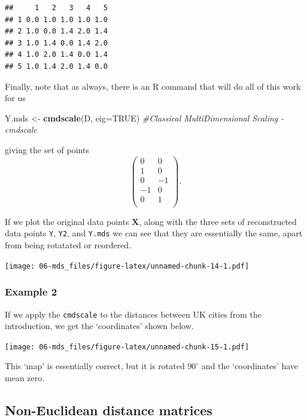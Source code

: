 \documentclass[]{book}
\newenvironment{Shaded}{\begin{snugshade}}{\end{snugshade}}
\newcommand{\CommentTok}[1]{\textcolor[rgb]{0.56,0.35,0.01}{\textit{#1}}}
\newcommand{\DataTypeTok}[1]{\textcolor[rgb]{0.13,0.29,0.53}{#1}}
\newcommand{\KeywordTok}[1]{\textcolor[rgb]{0.13,0.29,0.53}{\textbf{#1}}}
\newcommand{\NormalTok}[1]{#1}
\newcommand{\OtherTok}[1]{\textcolor[rgb]{0.56,0.35,0.01}{#1}}
\newcommand{\StringTok}[1]{\textcolor[rgb]{0.31,0.60,0.02}{#1}}
\theoremstyle{definition}
\theoremstyle{definition}
\theoremstyle{definition}
\theoremstyle{remark}
\begin{document}
\begin{verbatim}
##     1   2   3   4   5
## 1 0.0 1.0 1.0 1.0 1.0
## 2 1.0 0.0 1.4 2.0 1.4
## 3 1.0 1.4 0.0 1.4 2.0
## 4 1.0 2.0 1.4 0.0 1.4
## 5 1.0 1.4 2.0 1.4 0.0
\end{verbatim}

Finally, note that as always, there is an R command that will do all of this work for us

\begin{Shaded}
\begin{Highlighting}[]
\NormalTok{Y.mds <-}\StringTok{ }\KeywordTok{cmdscale}\NormalTok{(D, }\DataTypeTok{eig=}\OtherTok{TRUE}\NormalTok{) }\CommentTok{#Classical MultiDimensional Scaling - cmdscale}
\end{Highlighting}
\end{Shaded}

giving the set of points
\[\begin{pmatrix}0&0 \\1&0 \\0&-1 \\-1&0 \\0&1 \\\end{pmatrix}.\]

If we plot the original data points \(\mathbf X\), along with the three sets of reconstructed data points \texttt{Y}, \texttt{Y2}, and \texttt{Y.mds} we can see that they are essentially the same, apart from being rotatated or reordered.

\texttt{[image: 06-mds\_files/figure-latex/unnamed-chunk-14-1.pdf]}

\hypertarget{example-2}{%
\subsubsection*{Example 2}\label{example-2}}

If we apply the \texttt{cmdscale} to the distances between UK cities from the introduction, we get the `coordinates' shown below.

\texttt{[image: 06-mds\_files/figure-latex/unnamed-chunk-15-1.pdf]}

This `map' is essentially correct, but it is rotated \(90^\circ\) and the `coordinates' have mean zero.

\hypertarget{non-euclidean-distance-matrices}{%
\subsection{Non-Euclidean distance matrices}\label{non-euclidean-distance-matrices}}
\end{document}
